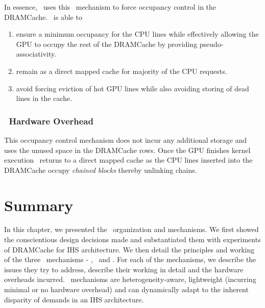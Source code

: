 \par In essence, \cachename\ uses this \chaining\ mechanism to force occupancy control in the DRAMCache. \chaining\ is able to 
\begin{enumerate}[label=(\roman*)]
	\item ensure a minimum occupancy for the CPU lines while effectively allowing the GPU to occupy the rest of the DRAMCache by providing pseudo-associativity.
	\item remain as a direct mapped cache for majority of the CPU requests.
	\item avoid forcing eviction of hot GPU lines while also avoiding storing of dead lines in the cache.
\end{enumerate}

\subsubsection{\chaining\ Hardware Overhead}
This occupancy control mechanism does not incur any additional storage and uses the unused space in the DRAMCache rows. Once the GPU finishes kernel execution \cachename\ returns to a direct mapped cache as the CPU lines inserted into the DRAMCache occupy \textit{chained blocks} thereby unlinking chains. 

\section{Summary}
In this chapter, we presented the \cachename\ organization and mechanisms. We first showed the conscientious design decisions made and substantiated them with experiments of DRAMCache for IHS architecture. We then detail the principles and working of the three \cachename\ mechanisms - \prioname, \bypassname\ and \chaining. For each of the mechanisms, we describe the issues they try to address, describe their working in detail and the hardware overheads incurred. \cachename\ mechanisms are heterogeneity-aware, lightweight (incurring minimal or no hardware overhead) and can dynamically adapt to the inherent disparity of demands in an IHS architecture.

